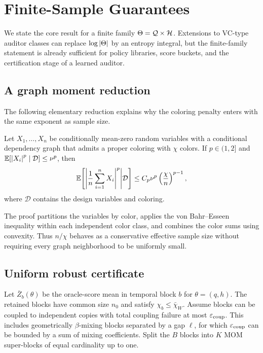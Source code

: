 \section{Finite-Sample Guarantees}
\label{sec:theory}

We state the core result for a finite family $\Theta=\mathcal{Q}\times\mathcal{H}$. Extensions to VC-type auditor classes can replace $\log\left|\Theta\right|$ by an entropy integral, but the finite-family statement is already sufficient for policy libraries, score buckets, and the certification stage of a learned auditor.

\subsection{A graph moment reduction}
The following elementary reduction explains why the coloring penalty enters with the same exponent as sample size.

\begin{lemma}
\label{lem:graph-moment}
Let $X_1,\ldots,X_n$ be conditionally mean-zero random variables with a conditional dependency graph that admits a proper coloring with $\chi$ colors. If $p\in(1,2]$ and $\mathbb{E}[\left|X_i\right|^p\mid\mathcal D]\le\nu^p$, then
\begin{equation}
\mathbb{E}\!\left[
\left|\frac{1}{n}\sum_{i=1}^nX_i\right|^p
\middle|\mathcal D
\right]
\le C_p\nu^p\left(\frac{\chi}{n}\right)^{p-1},
\label{eq:graph-moment}
\end{equation}
where $\mathcal D$ contains the design variables and coloring.
\end{lemma}

The proof partitions the variables by color, applies the von Bahr--Esseen inequality within each independent color class, and combines the color sums using convexity. Thus $n/\chi$ behaves as a conservative effective sample size without requiring every graph neighborhood to be uniformly small.

\subsection{Uniform robust certificate}
Let $\bar Z_b(\theta)$ be the oracle-score mean in temporal block $b$ for $\theta=(q,h)$. The retained blocks have common size $n_0$ and satisfy $\chi_b\le\bar\chi_W$. Assume blocks can be coupled to independent copies with total coupling failure at most $\varepsilon_{\mathrm{coup}}$. This includes geometrically $\beta$-mixing blocks separated by a gap $\ell$, for which $\varepsilon_{\mathrm{coup}}$ can be bounded by a sum of mixing coefficients. Split the $B$ blocks into $K$ MOM super-blocks of equal cardinality up to one.


